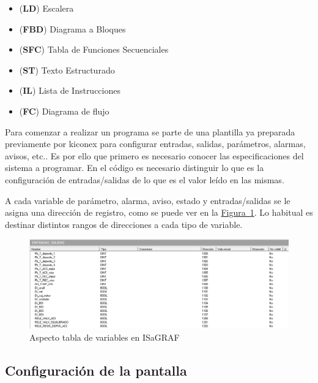 \begin{itemize}
  \item (\textbf{LD}) Escalera  
  \item (\textbf{FBD}) Diagrama a Bloques 
  \item (\textbf{SFC}) Tabla de Funciones Secuenciales 
  \item (\textbf{ST}) Texto Estructurado 
  \item (\textbf{IL}) Lista de Instrucciones 
  \item (\textbf{FC}) Diagrama de flujo 
\end{itemize}

Para comenzar a realizar un programa se parte de una plantilla ya preparada previamente por kiconex para configurar entradas, salidas, parámetros, alarmas, avisos, etc.. Es por ello que primero es necesario conocer las especificaciones del sistema a programar. En el código es necesario distinguir lo que es la configuración de entradas/salidas de lo que es el valor leído en las mismas.


A cada variable de parámetro, alarma, aviso, estado y entradas/salidas se le asigna una dirección de registro, como se puede ver en la \hyperref[figura:variablesIsagraf]{Figura~\ref{figura:variablesIsagraf}}. Lo habitual es destinar distintos rangos de direcciones a cada tipo de variable. 

\begin{figure}[H]
  \centering
  \includegraphics[width=\textwidth, keepaspectratio]{img/tablaRegistros}
  \caption{Aspecto tabla de variables en ISaGRAF}
  \label{figura:variablesIsagraf}
\end{figure}

\subsection{Configuración de la pantalla}
\label{subsec:displayconfig}

